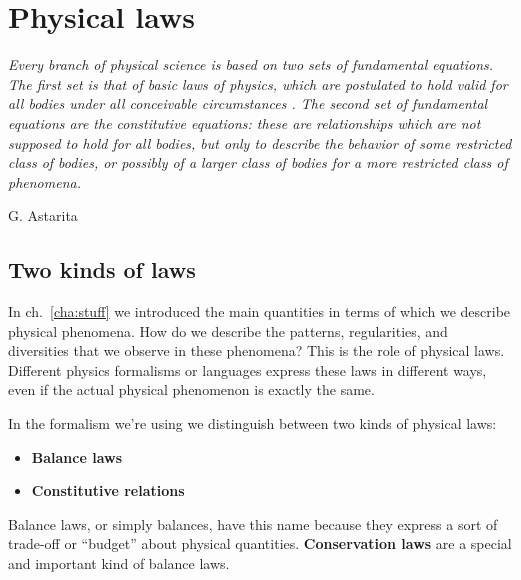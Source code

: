 \documentclass[a4paper,12pt,%
onecolumn,oneside,titlepage,%
british%
]{memoir}
\renewcommand*{\|}[1][]{\nonscript\:#1\vert\nonscript\:\mathopen{}}
\newcommand*{\chap}{ch.}%
\begin{document}
% 
%

\printpagenotes*
\clearpage
\chapter{Physical laws}
\label{cha:laws}


\epigraph{\emph{%
Every branch of physical science is based on two sets of fundamental equations. The first set is that of basic laws of physics, which are postulated to hold valid for all bodies under all conceivable circumstances \textelp{}. The second set of fundamental equations are the constitutive equations: these are relationships which are not supposed to hold for all bodies, but only to describe the behavior of some restricted class of bodies, or possibly of a larger class of bodies for a more restricted class of phenomena.
}}{G. Astarita \cites*{astarita1989_r1990}}

\section{Two kinds of laws}
\label{sec:two_kinds}

In \chap~\ref{cha:stuff} we introduced the main quantities in terms of which we describe physical phenomena. How do we describe the patterns, regularities, and diversities that we observe in these phenomena? This is the role of physical laws. Different physics formalisms or languages express these laws in different ways, even if the actual physical phenomenon is exactly the same.

In the formalism we're using we distinguish between two kinds of physical laws:
\begin{itemize}
\item \textbf{Balance laws}
\item \textbf{Constitutive relations}
\end{itemize}

Balance laws, or simply balances, have this name because they express a sort of trade-off or \enquote{budget} about physical quantities. \textbf{Conservation laws} are a special and important kind of balance laws.
\end{document}
